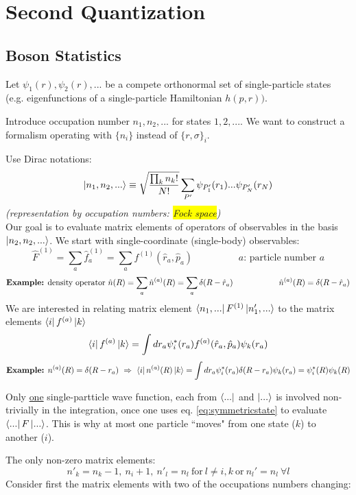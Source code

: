 \documentclass[10pt]{article}
\newcommand{\smallspace}{\hspace{2cm}}
\begin{document}
\section{Second Quantization}
\subsection{Boson Statistics}
Let $\psi_1(r), \psi_2(r),...$ be a compete orthonormal set of single-particle states (e.g. eigenfunctions of a single-particle Hamiltonian $h(p,r))$.
\par Introduce occupation number $n_1, n_2, ...$ for states $1, 2, ...$. We want to construct a formalism operating with $\{n_i\}$ instead of $\{r, \sigma\}_i$. 
\par Use Dirac notations:
\begin{equation}
\ket{n_1, n_2, ...} \equiv \sqrt{\frac{\prod_k n_k!}{N!}} \sum_{P'}\psi_{P'_1}(r_1)...\psi_{P'_N}(r_N)
\label{eq:symmetricstate}
\end{equation}
\textit{(representation by occupation numbers: \colorbox{yellow}{Fock space})}\\
\noindent Our goal is to evaluate matrix elements of operators of observables in the basis $\ket{n_2, n_2,...}$. We start with single-coordinate (single-body) observables:
$$
\hat F^{(1)} = \sum_a \hat f_a^{(1)} = \sum_a f^{(1)}(\hat r_a, \hat p_a) \smallspace \text{$a$: particle number $a$}
$$
$$
\text{\textbf{Example:} density operator } \hat n(R) = \sum_a \hat n^{(a)}(R) = \sum_a \delta(R - \hat r_a) \smallspace \hat n^{(a)}(R) = \delta(R - \hat r_a)
$$
We are interested in relating matrix element $\bra{n_1,...}F^{(1)}\ket{n'_1,...}$ to the matrix elements $\bra{i}f^{(a)}\ket{k}$
$$
\bra{i}f^{(a)}\ket{k} = \int dr_a \psi^\ast _i(r_a) f^{(a)}(\hat r_a, \hat p_a) \psi_k(r_a)
$$
$$
\text{\textbf{Example:} }  n^{(a)}(R) = \delta(R-r_a) \ \Rightarrow \ \bra{i} n^{(a)}(R)\ket{k} = \int dr_a \psi_i^\ast(r_a) \delta(R-r_a)\psi_k(r_a)= \psi_i^\ast(R)\psi_k(R)
$$
\par Only \underline{one} single-partticle wave function, each from $\bra{...}$ and $\ket{...}$ is involved non-trivially in the integration, once one uses eq. \ref{eq:symmetricstate} to evaluate $\bra{...}F\ket{...}$. This is why at most one particle ``moves" from one state ($k$) to another ($i$).
\par The only non-zero matrix elements:
$$
n'_k = n_k-1, \ n_i + 1, \ n'_l = n_l  \ \text{for} \ l\neq i,k \ \text{or} \ n_l' = n_l \ \forall l
$$
Consider first the matrix elements with two of the occupations numbers changing:
\end{document}
